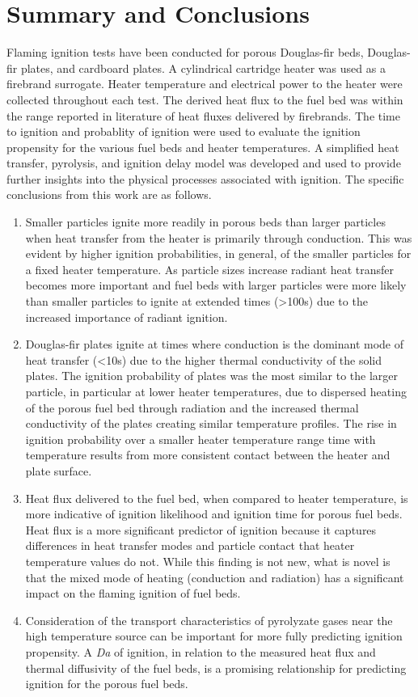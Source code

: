 \section*{Summary and Conclusions}
    Flaming ignition tests have been conducted for porous Douglas-fir beds, Douglas-fir plates, and cardboard plates. A cylindrical cartridge heater was used as a firebrand surrogate. Heater temperature and electrical power to the heater were collected throughout each test. The derived heat flux to the fuel bed was within the range reported in literature of heat fluxes delivered by firebrands.  The time to ignition and probablity of ignition were used to evaluate the ignition propensity for the various fuel beds and heater temperatures.  A simplified heat transfer, pyrolysis, and ignition delay model was developed and used to provide further insights into the physical processes associated with ignition. The specific conclusions from this work are as follows.
        \begin{enumerate}
            \item 
                Smaller particles ignite more readily in porous beds than larger particles when heat transfer from the heater is primarily through conduction. This was evident by higher ignition probabilities, in general, of the smaller particles for a fixed heater temperature. As particle sizes increase radiant heat transfer becomes more important and fuel beds with larger particles were more likely than smaller particles to ignite at extended times (\textgreater 100\si{\second}) due to the increased importance of radiant ignition. 
            \item
                Douglas-fir plates ignite at times where conduction is the dominant mode of heat transfer (\textless 10\si{\second}) due to the higher thermal conductivity of the solid plates. The ignition probability of plates was the most similar to the larger particle, in particular at lower heater temperatures, due to dispersed heating of the porous fuel bed through radiation and the increased thermal conductivity of the plates creating similar temperature profiles. The rise in ignition probability  over a smaller heater temperature range time with temperature results from more consistent contact between the heater and plate surface.
            \item 
                Heat flux delivered to the fuel bed, when compared to heater temperature, is more indicative of ignition likelihood and ignition time for porous fuel beds. Heat flux is a more significant predictor of ignition because it captures differences in heat transfer modes and particle contact that heater temperature values do not. While this finding is not new, what is novel is that the mixed mode of heating (conduction and radiation) has a significant impact on the flaming ignition of fuel beds.
            \item 
                Consideration of the transport characteristics of pyrolyzate gases near the high temperature source can be important for more fully predicting ignition propensity. A \textit{Da} of ignition, in relation to the measured heat flux and thermal diffusivity of the fuel beds, is a promising relationship for predicting ignition for the porous fuel beds.  
        \end{enumerate}
